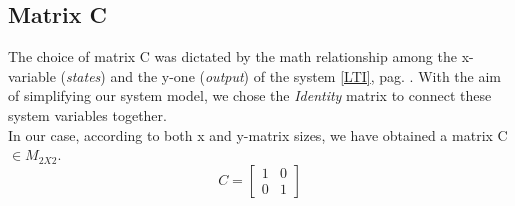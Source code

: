 \subsection{Matrix C}
	The choice of matrix C was dictated by the math relationship among the x-variable (\textit{states}) and the y-one (\textit{output}) of the system \ref{LTI}, pag. \pageref{LTI}. With the aim of simplifying our system model, we chose the \textit{Identity} matrix to connect these system variables together. \\ In our case, according to both x and y-matrix sizes, we have obtained a matrix C $\in M_{2X2}$.
		\begin{equation}
			C = 
			\begin{bmatrix}
				1 & 0 \\
				0 & 1
			\end{bmatrix}
		\end{equation}